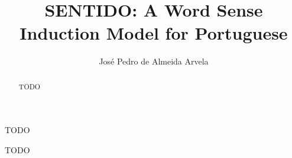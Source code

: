 \documentclass{template/ist-thesis}
\title{SENTIDO: A Word Sense Induction Model for Portuguese}
\author{José Pedro de Almeida Arvela}
\begin{document}
\maketitle

\begin{aknowledgements}
TODO
\end{aknowledgements}

\begin{abstract}
TODO
\end{abstract}

\begin{resumo}
TODO
\end{resumo}

\tableofcontents
\end{document}
